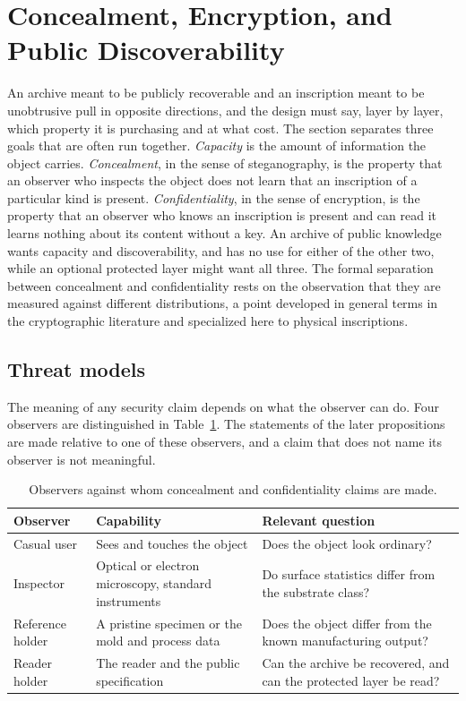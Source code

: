 \section{Concealment, Encryption, and Public Discoverability}\label{sec:stego}

An archive meant to be publicly recoverable and an inscription meant to be unobtrusive pull in opposite directions, and the design must say, layer by layer, which property it is purchasing and at what cost. The section separates three goals that are often run together. \emph{Capacity} is the amount of information the object carries. \emph{Concealment}, in the sense of steganography, is the property that an observer who inspects the object does not learn that an inscription of a particular kind is present. \emph{Confidentiality}, in the sense of encryption, is the property that an observer who knows an inscription is present and can read it learns nothing about its content without a key. An archive of public knowledge wants capacity and discoverability, and has no use for either of the other two, while an optional protected layer might want all three. The formal separation between concealment and confidentiality rests on the observation that they are measured against different distributions, a point developed in general terms in the cryptographic literature \cite{cachin1998,hopper2002,simmons1984} and specialized here to physical inscriptions.

\subsection{Threat models}

The meaning of any security claim depends on what the observer can do. Four observers are distinguished in Table~\ref{tab:threat}. The statements of the later propositions are made relative to one of these observers, and a claim that does not name its observer is not meaningful.

\begin{table}[h]
\centering
\small
\begin{tabular}{@{}p{2.6cm}p{4.1cm}p{5.0cm}@{}}
\toprule
Observer & Capability & Relevant question \\
\midrule
Casual user & Sees and touches the object & Does the object look ordinary? \\
Inspector & Optical or electron microscopy, standard instruments & Do surface statistics differ from the substrate class? \\
Reference holder & A pristine specimen or the mold and process data & Does the object differ from the known manufacturing output? \\
Reader holder & The reader and the public specification & Can the archive be recovered, and can the protected layer be read? \\
\bottomrule
\end{tabular}
\caption{Observers against whom concealment and confidentiality claims are made.}
\label{tab:threat}
\end{table}


